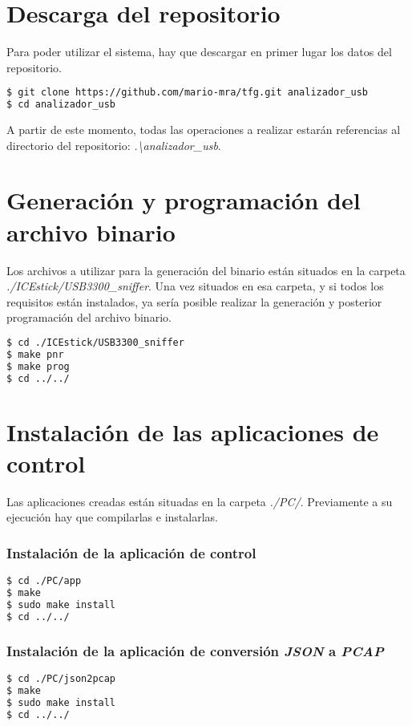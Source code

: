 \section{Descarga del repositorio}
Para poder utilizar el sistema, hay que descargar en primer lugar los datos del repositorio.
\begin{lstlisting}[language=bash]
$ git clone https://github.com/mario-mra/tfg.git analizador_usb
$ cd analizador_usb
\end{lstlisting}
A partir de este momento, todas las operaciones a realizar estarán referencias al directorio del repositorio: \emph{.\textbackslash analizador\_usb}.


\section{Generación y programación del archivo binario}
Los archivos a utilizar para la generación del binario están situados en la carpeta \emph{./ICEstick/USB3300\_sniffer}. Una vez situados en esa carpeta, y si todos los requisitos están instalados, ya sería posible realizar la generación y posterior programación del archivo binario.

\begin{lstlisting}[language=bash]
$ cd ./ICEstick/USB3300_sniffer
$ make pnr
$ make prog
$ cd ../../
\end{lstlisting}


\section{Instalación de las aplicaciones de control}
Las aplicaciones creadas están situadas en la carpeta \emph{./PC/}. Previamente a su ejecución hay que compilarlas e instalarlas.

\subsubsection{Instalación de la aplicación de control}
\begin{lstlisting}[language=bash]
$ cd ./PC/app
$ make
$ sudo make install
$ cd ../../
\end{lstlisting}

\subsubsection{Instalación de la aplicación de conversión \emph{JSON} a \emph{PCAP}}
\begin{lstlisting}[language=bash]
$ cd ./PC/json2pcap
$ make
$ sudo make install
$ cd ../../
\end{lstlisting}


